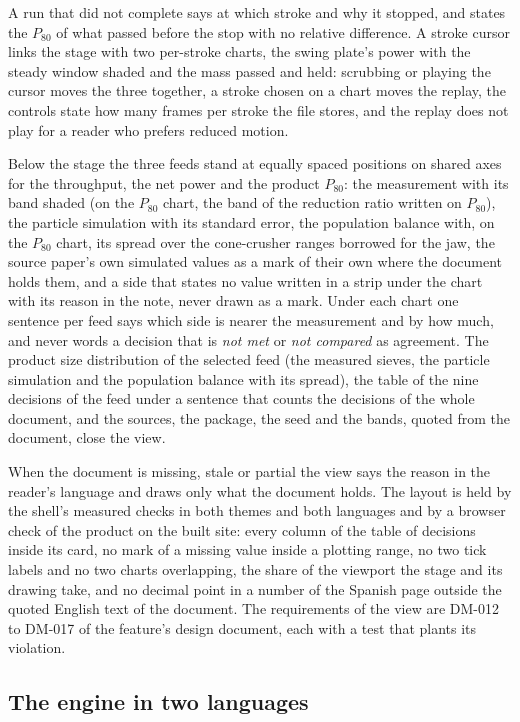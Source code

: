 A run that did not complete says at which stroke and why it stopped, and states the $P_{80}$ of what passed before the stop with no relative difference. A stroke cursor links the stage with two per-stroke charts, the swing plate's power with the steady window shaded and the mass passed and held: scrubbing or playing the cursor moves the three together, a stroke chosen on a chart moves the replay, the controls state how many frames per stroke the file stores, and the replay does not play for a reader who prefers reduced motion.

Below the stage the three feeds stand at equally spaced positions on shared axes for the throughput, the net power and the product $P_{80}$: the measurement with its band shaded (on the $P_{80}$ chart, the band of the reduction ratio written on $P_{80}$), the particle simulation with its standard error, the population balance with, on the $P_{80}$ chart, its spread over the cone-crusher ranges borrowed for the jaw, the source paper's own simulated values as a mark of their own where the document holds them, and a side that states no value written in a strip under the chart with its reason in the note, never drawn as a mark. Under each chart one sentence per feed says which side is nearer the measurement and by how much, and never words a decision that is \emph{not met} or \emph{not compared} as agreement. The product size distribution of the selected feed (the measured sieves, the particle simulation and the population balance with its spread), the table of the nine decisions of the feed under a sentence that counts the decisions of the whole document, and the sources, the package, the seed and the bands, quoted from the document, close the view.

When the document is missing, stale or partial the view says the reason in the reader's language and draws only what the document holds. The layout is held by the shell's measured checks in both themes and both languages and by a browser check of the product on the built site: every column of the table of decisions inside its card, no mark of a missing value inside a plotting range, no two tick labels and no two charts overlapping, the share of the viewport the stage and its drawing take, and no decimal point in a number of the Spanish page outside the quoted English text of the document. The requirements of the view are DM-012 to DM-017 of the feature's design document, each with a test that plants its violation.

\subsection{The engine in two languages}\label{sec:arch-engine}

